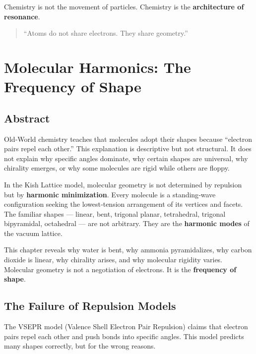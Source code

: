 \documentclass[11pt, letterpaper, openany]{book}
\begin{document}
Chemistry is not the movement of particles.  
Chemistry is the \textbf{architecture of resonance}.

\begin{quote}
“Atoms do not share electrons. They share geometry.”
\end{quote}

\chapter{Molecular Harmonics: The Frequency of Shape}

\section{Abstract}

Old‑World chemistry teaches that molecules adopt their shapes because “electron pairs
repel each other.” This explanation is descriptive but not structural. It does not explain
why specific angles dominate, why certain shapes are universal, why chirality emerges,
or why some molecules are rigid while others are floppy.

In the Kish Lattice model, molecular geometry is not determined by repulsion but by
\textbf{harmonic minimization}. Every molecule is a standing‑wave configuration seeking the
lowest‑tension arrangement of its vertices and facets. The familiar shapes — linear,
bent, trigonal planar, tetrahedral, trigonal bipyramidal, octahedral — are not arbitrary.
They are the \textbf{harmonic modes} of the vacuum lattice.

This chapter reveals why water is bent, why ammonia pyramidalizes, why carbon dioxide
is linear, why chirality arises, and why molecular rigidity varies. Molecular geometry is
not a negotiation of electrons. It is the \textbf{frequency of shape}.

\section{The Failure of Repulsion Models}

The VSEPR model (Valence Shell Electron Pair Repulsion) claims that electron pairs repel
each other and push bonds into specific angles. This model predicts many shapes
correctly, but for the wrong reasons.
\end{document}
